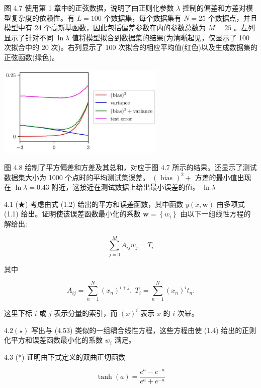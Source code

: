 \documentclass[10pt]{report}
\begin{document}
图 4.7 使用第 1 章中的正弦数据，说明了由正则化参数 \(\lambda\) 控制的偏差和方差对模型复杂度的依赖性。有 \(L = {100}\) 个数据集，每个数据集有 \(N = {25}\) 个数据点，并且模型中有 24 个高斯基函数，因此包括偏差参数在内的参数总数为 \(M = {25}\) 。左列显示了针对不同 \(\ln \lambda\) 值将模型拟合到数据集的结果(为清晰起见，仅显示了 100 次拟合中的 20 次)。右列显示了 100 次拟合的相应平均值(红色)以及生成数据集的正弦函数(绿色)。

\begin{center}
\includegraphics[max width=0.6\textwidth]{images/0194e279-9b28-703a-88f4-c3ac21e2010d_147_767_344_784_430_0.jpg}
\end{center}
\hspace*{3em} 

图 4.8 绘制了平方偏差和方差及其总和，对应于图 4.7 所示的结果。还显示了测试数据集大小为 1000 个点时的平均测试集误差。 \({\left( \text{ bias }\right) }^{2} +\) 方差的最小值出现在 \(\ln \lambda  = {0.43}\) 附近，这接近在测试数据上给出最小误差的值。 \(\ln \lambda\)

4.1 (★) 考虑由式 (1.2) 给出的平方和误差函数，其中函数 \(y\left( {x,\mathbf{w}}\right)\) 由多项式 (1.1) 给出。证明使该误差函数最小化的系数 \(\mathbf{w} = \left\{  {w}_{i}\right\}\) 由以下一组线性方程的解给出:

\[
\mathop{\sum }\limits_{{j = 0}}^{M}{A}_{ij}{w}_{j} = {T}_{i} \tag{4.53}
\]

其中

\[
{A}_{ij} = \mathop{\sum }\limits_{{n = 1}}^{N}{\left( {x}_{n}\right) }^{i + j},\;{T}_{i} = \mathop{\sum }\limits_{{n = 1}}^{N}{\left( {x}_{n}\right) }^{i}{t}_{n}. \tag{4.54}
\]

这里下标 \(i\) 或 \(j\) 表示分量的索引，而 \({\left( x\right) }^{i}\) 表示 \(x\) 的 \(i\) 次幂。

\({4.2}\left( \star \right)\) 写出与 (4.53) 类似的一组耦合线性方程，这些方程由使 (1.4) 给出的正则化平方和误差函数最小化的系数 \({w}_{i}\) 满足。

4.3 (*) 证明由下式定义的双曲正切函数

\[
\tanh \left( a\right)  = \frac{{e}^{a} - {e}^{-a}}{{e}^{a} + {e}^{-a}} \tag{4.55}
\]
\end{document}
